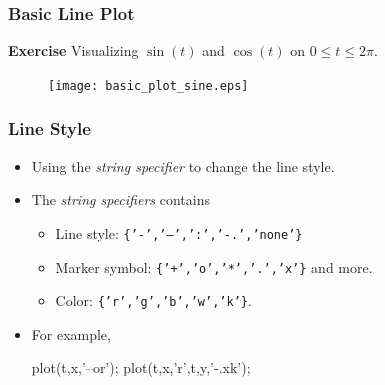 \documentclass[compress]{beamer}  %
\begin{document}
\begin{frame}[fragile]
\frametitle{Basic Line Plot}
\textbf{Exercise} 
Visualizing $\sin(t)$ and $\cos(t)$ on $0 \leq t \leq 2\pi$. \pause
\begin{figure}[htb]
        \centering
        \texttt{[image: basic\_plot\_sine.eps]}
\end{figure}

\end{frame}
\begin{frame}[fragile]
\frametitle{Line Style}

\begin{itemize}[<+->]
    \item Using the \textit{string specifier} to change the line style.
    \item The \textit{string specifiers} contains
          \begin{itemize}
          \item Line style: \texttt{\{'-','--',':','-.','none'\}}
          \item Marker symbol: \texttt{\{'+','o','*','.','x'\}} and more.
          \item Color: \texttt{\{'r','g','b','w','k'\}}.
          \end{itemize}
    \item For example,
          \begin{matlabcode}[numbers=none,frame=none]
          plot(t,x,'--or');
          plot(t,x,'r',t,y,'-.xk');
          \end{matlabcode}

\end{itemize}

\end{frame}
\end{document}
